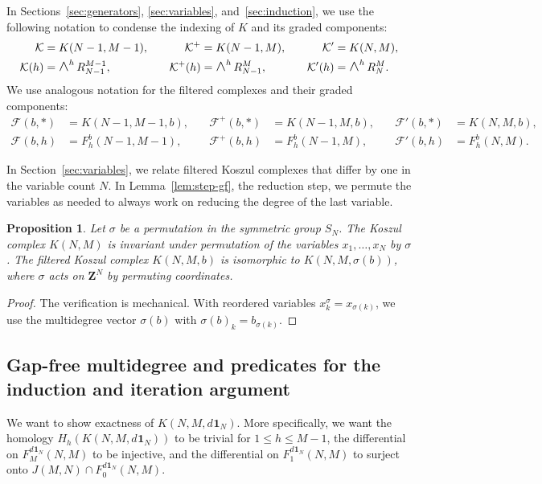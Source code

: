 \documentclass[12pt]{amsart}
\newtheorem{proposition}[theorem]{Proposition}
\theoremstyle{definition}
\theoremstyle{remark}
\newcommand{\Z}{\mathbf Z}
\newcommand{\K}{\mathcal K}
\newcommand{\Kplus}{{{\mathcal K}^+}}
\newcommand{\FF}{\mathcal F}
\newcommand{\LL}{\mathcal K} %
\newcommand{\One}{\mathbf{1}}
\newcommand{\dOne}[1]{d\mspace{1mu}\One_{#1}}
\newcommand{\WedgeAux}[2]{\scalebox{1.35}{$#1\wedge$}}
\newcommand{\Wedge}{\mathop{\mathpalette\WedgeAux\relax}\nolimits}
\begin{document}
In Sections~\ref{sec:generators}, \ref{sec:variables}, and~\ref{sec:induction},
we use the following notation
to condense the indexing of $K$ and its graded components:
\begin{align*}
\K &= K(N-1, M-1), \quad &  \Kplus& = K(N-1, M), \quad & \K' &= K(N, M), \\
\LL(h) &= \Wedge^h R_{N-1}^{M-1}, \quad & \LL^+(h)& = \Wedge^h R_{N-1}^{M}, \quad &
\LL'(h) &= \Wedge^h R_{N}^{M}.
\end{align*}
We use analogous notation for the filtered complexes and their graded components:
\begin{align*}
\FF(b, *) &= K(N-1, M-1, b), \quad &  \FF^+(b, *)& = K(N-1, M, b), \quad & \FF'(b, *) &= K(N, M, b), \\
\FF(b, h) & = F_h^b(N-1, M-1), \quad & \FF^+(b, h) & = F_h^b(N-1, M), \quad &
\FF'(b, h) & = F_h^b(N, M).
\end{align*}

In Section~\ref{sec:variables}, %
we relate filtered Koszul complexes that differ by
one in the variable count $N$. %
In Lemma~\ref{lem:step-gf}, the reduction step,
we permute the variables as needed to always work on reducing the degree of
the last variable.
\begin{proposition}\label{prop:permutevar}
  Let $\sigma$ be a permutation in the symmetric group $S_N$.
  The Koszul complex $K(N, M)$ is invariant under permutation of the
  variables $x_1, \ldots, x_N$ by $\sigma$.  The filtered Koszul complex
  $K(N, M, b)$ is isomorphic to $K(N, M, \sigma(b))$, where $\sigma$ acts
  on $\Z^N$ by permuting coordinates.
\end{proposition}
\begin{proof} The verification is mechanical.
  With reordered
  variables $x^{\sigma}_k = x_{\sigma(k)}$, we use the multidegree
  vector $\sigma(b)$ with $\sigma(b)_k = b_{\sigma(k)}$.
\end{proof}

\subsection{Gap-free multidegree and predicates
  for the induction and iteration argument}\label{subsec:pred}

We want to show exactness of $K(N, M, \dOne{N})$.  More specifically,
we want the homology $H_h(K(N, M, \dOne{N}))$ to be trivial for $1 \leq h \leq M-1$,
the differential on $F^{\dOne{N}}_M(N, M)$ to be injective,
and the differential on $F^{\dOne{N}}_1(N, M)$ to surject onto
$J(M, N) \cap F^{\dOne{N}}_0(N, M)$.
\end{document}
